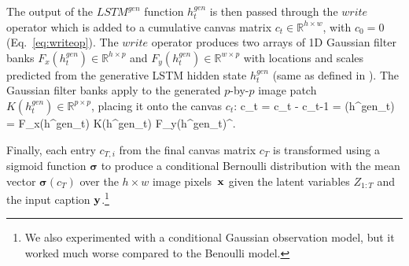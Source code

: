 \documentclass{article} %
\newcommand{\Eqref}[1]{Eq.~\ref{#1}} %
\def\beqa#1\eeqa{\begin{eqnarray}#1\end{eqnarray}}
\newcommand{\sigmoid}{\boldsymbol{\sigma}}
\newcommand{\hdec}{h^{gen}}
\newcommand{\writeop}{\mathit{write}}
\newcommand{\decoder}{\mathit{LSTM}^{gen}}
\newcommand{\canv}{c}
\newcommand{\Lat}{Z}
\newcommand{\icaption}{{\bf{y}}}
\newcommand{\oimage}{{\bf{x}}}
\newcommand{\gFilterx}{F_x}
\newcommand{\gFiltery}{F_y}
\newcommand{\WriteFunc}{K}
\newcommand{\real}{\mathbb{R}}
\begin{document}
The output of the $\decoder$ function $\hdec_t$ is then passed through the $\writeop$ operator 
which is added to a cumulative canvas matrix $c_t \in \real^{h \times w}$, with $c_0=0$ (\Eqref{eq:writeop}). 
The $\writeop$ operator produces two arrays of 1D Gaussian filter banks $\gFilterx(\hdec_t)\in\real^{h\times p}$ and $\gFiltery(\hdec_t)\in\real^{w\times p}$ with locations and scales predicted from the generative LSTM hidden state $\hdec_t$ (same as defined in \cite{gregor_draw}). The Gaussian filter banks apply to the generated $p$-by-$p$ image patch $\WriteFunc(\hdec_t) \in \real^{p\times p}$, placing it onto the canvas $c_t$:
\beqa
\label{eq:write}
\Delta \canv_{t} = \canv_{t} - \canv_{t-1} = \writeop(\hdec_t) = \gFilterx(\hdec_t) \WriteFunc(\hdec_t) \gFiltery(\hdec_t)^\top. 
\eeqa

Finally, each entry $\canv_{T,i}$ from the final canvas matrix $\canv_T$ is transformed using a sigmoid function $\sigmoid$ to produce a conditional Bernoulli 
distribution with the mean vector $\sigmoid(\canv_{T})$ over the 
$h\times w$ image pixels~$\oimage$ given the latent variables 
$\Lat_{1:T}$ and the input caption $\icaption$.\footnote{We also experimented with a conditional Gaussian observation model, but
it worked much worse compared to the Benoulli model.}
\end{document}
